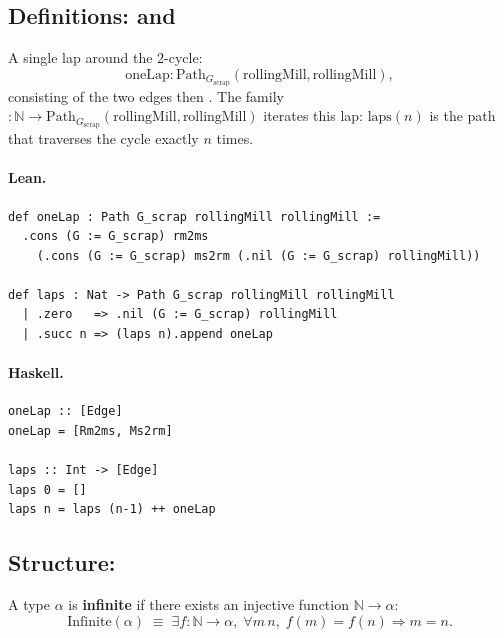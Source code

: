 \documentclass[11pt,a4paper]{article}
\begin{document}
\subsection{Definitions:  and }

\begin{defn}
A single lap around the 2-cycle:
\[
  \text{oneLap} : \mathrm{Path}_{G_{\mathrm{scrap}}}(\text{rollingMill},
  \text{rollingMill}),
\]
consisting of the two edges  then .  The family
 $: \mathbb{N} \to
\mathrm{Path}_{G_{\mathrm{scrap}}}(\text{rollingMill},\text{rollingMill})$
iterates this lap: $\text{laps}(n)$ is the path that traverses the cycle exactly
$n$ times.
\end{defn}

\paragraph{Lean.}
\begin{lstlisting}[style=lean]
def oneLap : Path G_scrap rollingMill rollingMill :=
  .cons (G := G_scrap) rm2ms
    (.cons (G := G_scrap) ms2rm (.nil (G := G_scrap) rollingMill))

def laps : Nat -> Path G_scrap rollingMill rollingMill
  | .zero   => .nil (G := G_scrap) rollingMill
  | .succ n => (laps n).append oneLap
\end{lstlisting}

\paragraph{Haskell.}
\begin{lstlisting}[style=haskell]
oneLap :: [Edge]
oneLap = [Rm2ms, Ms2rm]

laps :: Int -> [Edge]
laps 0 = []
laps n = laps (n-1) ++ oneLap
\end{lstlisting}


\subsection{Structure: }

\begin{defn}
A type $\alpha$ is \textbf{infinite} if there exists an injective function
$\mathbb{N} \to \alpha$:
\[
  \mathrm{Infinite}(\alpha) \;\equiv\; \exists f : \mathbb{N} \to \alpha,\;
  \forall m\, n,\; f(m) = f(n) \Rightarrow m = n.
\]
\end{defn}
\end{document}
